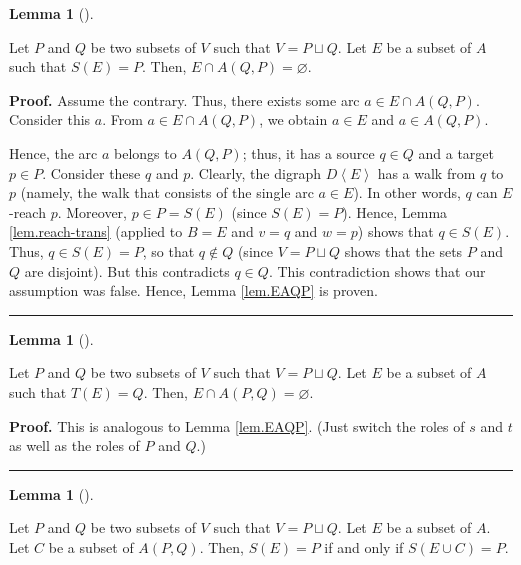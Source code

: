 \documentclass[numbers=enddot,12pt,final,onecolumn,notitlepage]{scrartcl}%
\theoremstyle{definition}
\newtheorem{lem}[theo]{Lemma}
\newenvironment{lemma}[1][]
{\begin{lem}[#1]\begin{leftbar}}
{\end{leftbar}\end{lem}}
\newenvironment{proof}[1][Proof]{\noindent\textbf{#1.} }{\ \rule{0.5em}{0.5em}}
\theoremstyle{plainsl}
\begin{document}
\begin{lemma}
\label{lem.EAQP}Let $P$ and $Q$ be two subsets of $V$ such that $V=P\sqcup Q$.
Let $E$ be a subset of $A$ such that $S\left(  E\right)  =P$. Then, $E\cap
A\left(  Q,P\right)  =\varnothing$.
\end{lemma}

\begin{proof}
Assume the contrary. Thus, there exists some arc $a\in E\cap A\left(
Q,P\right)  $. Consider this $a$. From $a\in E\cap A\left(  Q,P\right)  $, we
obtain $a\in E$ and $a\in A\left(  Q,P\right)  $.

Hence, the arc $a$ belongs to $A\left(  Q,P\right)  $; thus, it has a source
$q\in Q$ and a target $p\in P$. Consider these $q$ and $p$. Clearly, the
digraph $D\left\langle E\right\rangle $ has a walk from $q$ to $p$ (namely,
the walk that consists of the single arc $a\in E$). In other words, $q$ can
$E$-reach $p$. Moreover, $p\in P=S\left(  E\right)  $ (since $S\left(
E\right)  =P$). Hence, Lemma \ref{lem.reach-trans} (applied to $B=E$ and $v=q$
and $w=p$) shows that $q\in S\left(  E\right)  $. Thus, $q\in S\left(
E\right)  =P$, so that $q\notin Q$ (since $V=P\sqcup Q$ shows that the sets
$P$ and $Q$ are disjoint). But this contradicts $q\in Q$. This contradiction
shows that our assumption was false. Hence, Lemma \ref{lem.EAQP} is proven.
\end{proof}

\begin{lemma}
\label{lem.EAPQ}Let $P$ and $Q$ be two subsets of $V$ such that $V=P\sqcup Q$.
Let $E$ be a subset of $A$ such that $T\left(  E\right)  =Q$. Then, $E\cap
A\left(  P,Q\right)  =\varnothing$.
\end{lemma}

\begin{proof}
This is analogous to Lemma \ref{lem.EAQP}. (Just switch the roles of $s$ and
$t$ as well as the roles of $P$ and $Q$.)
\end{proof}

\begin{lemma}
\label{lem.new0}Let $P$ and $Q$ be two subsets of $V$ such that $V=P\sqcup Q$.
Let $E$ be a subset of $A$. Let $C$ be a subset of $A\left(  P,Q\right)  $.
Then, $S\left(  E\right)  =P$ if and only if $S\left(  E\cup C\right)  =P$.
\end{lemma}
\end{document}
